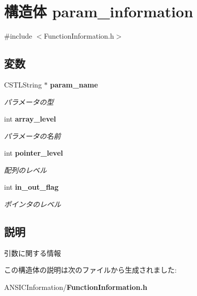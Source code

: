 \section{構造体 param\_\-information}
\label{structparam__information}


{\ttfamily \#include $<$FunctionInformation.h$>$}

\subsection*{変数}
\begin{DoxyCompactItemize}
\item 
CSTLString $\ast$ {\bf param\_\-name}\label{structparam__information_a205ee85821326a29e5729bd911bf0561}

\begin{DoxyCompactList}\small\item\em パラメータの型 \item\end{DoxyCompactList}\item 
int {\bf array\_\-level}\label{structparam__information_ac5e2a275c4e9848e2ad3a81937deda80}

\begin{DoxyCompactList}\small\item\em パラメータの名前 \item\end{DoxyCompactList}\item 
int {\bf pointer\_\-level}\label{structparam__information_a19b6cd4d981eb0050622f0195bd173b0}

\begin{DoxyCompactList}\small\item\em 配列のレベル \item\end{DoxyCompactList}\item 
int {\bf in\_\-out\_\-flag}\label{structparam__information_aed609e4d8cf941c7e83309dea078edab}

\begin{DoxyCompactList}\small\item\em ポインタのレベル \item\end{DoxyCompactList}\end{DoxyCompactItemize}


\subsection{説明}
引数に関する情報 

この構造体の説明は次のファイルから生成されました:\begin{DoxyCompactItemize}
\item 
ANSICInformation/{\bf FunctionInformation.h}\end{DoxyCompactItemize}
